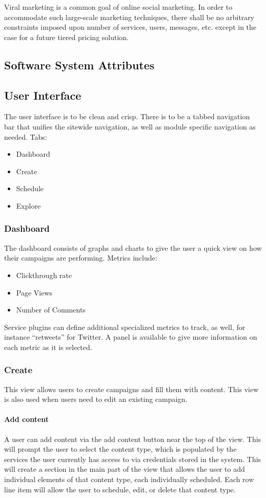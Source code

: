 \documentclass{report}
\begin{document}
Viral marketing is a common goal of online social marketing. In order to accommodate such large-scale marketing techniques, there shall be no arbitrary constraints imposed upon number of services, users, messages, etc. except in the case for a future tiered pricing solution. %

	\subsection{Software System Attributes} %
	\subsection{User Interface} %
		The user interface is to be clean and crisp. There is to be a tabbed 
		navigation bar that unifies the sitewide navigation, as well as module 
		specific navigation as needed.
        Tabs:
        \begin{itemize}
        \item Dashboard
        \item Create
        \item Schedule
        \item Explore
        \end{itemize}
        \subsubsection{Dashboard}
        The dashboard consists of graphs and charts to give the user a quick view on how their campaigns are performing.
		Metrics include:
        \begin{itemize}
        \item Clickthrough rate
        \item Page Views
        \item Number of Comments
        \end{itemize}
        Service plugins can define additional specialized metrics to track, as well, for instance ``retweets'' for Twitter.
        A panel is available to give more information on each metric as it is selected.
        \subsubsection{Create}
        This view allows users to create campaigns and fill them with content.  This view is also used when users need to edit an existing campaign.
        \paragraph{Add content}
        A user can add content via the add content button near the top of the view.  This will prompt the user to select the content type, which is populated by the services the user currently has access to via credentials stored in the system. This will create a section in the main part of the view that allows the user to add individual elements of that content type, each individually scheduled.  Each row line item will allow the user to schedule, edit, or delete that content type.
\end{document}
